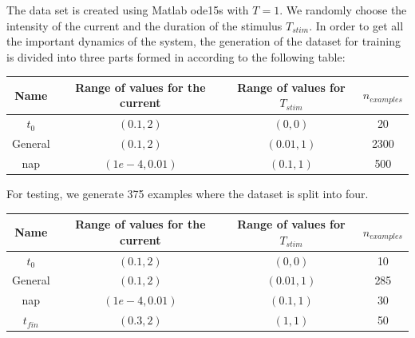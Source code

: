 \documentclass{article}
\begin{document}
The data set is created using Matlab ode15s with $T=1$. We randomly choose the intensity of the current and the duration of the stimulus $T_{stim}$. In order to get all the important dynamics of the system, the generation of the dataset for training is divided into three parts formed in according to the following table:
\begin{center}
    \begin{tabular}{cccc}
        \hline
        Name    & Range of values for the current & Range of values for $T_{stim}$ & $n_{examples}$ \\
        \hline\hline
        $t_0$   & $(0.1,2)$                       & $(0,0)$                        & 20             \\

        General & $(0.1,2)$                       & $(0.01,1)$                     & 2300           \\
        nap     & $(1e-4,0.01)$                   & $(0.1,1)$                      & 500            \\
        \hline
    \end{tabular}
\end{center}
For testing, we generate 375 examples where the dataset is split into four.
\begin{center}
    \begin{tabular}{cccc}
        \hline
        Name      & Range of values for the current & Range of values for $T_{stim}$ & $n_{examples}$ \\
        \hline\hline
        $t_0$     & $(0.1,2)$                       & $(0,0)$                        & 10             \\
        General   & $(0.1,2)$                       & $(0.01,1)$                     & 285            \\
        nap       & $(1e-4,0.01)$                   & $(0.1,1)$                      & 30             \\
        $t_{fin}$ & $(0.3,2)$                       & $(1,1)$                        & 50             \\
        \hline
    \end{tabular}
\end{center}
\end{document}
